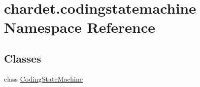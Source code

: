 \hypertarget{namespacechardet_1_1codingstatemachine}{}\section{chardet.\+codingstatemachine Namespace Reference}
\label{namespacechardet_1_1codingstatemachine}
\subsection*{Classes}
\begin{DoxyCompactItemize}
\item 
class \hyperlink{classchardet_1_1codingstatemachine_1_1_coding_state_machine}{Coding\+State\+Machine}
\end{DoxyCompactItemize}
